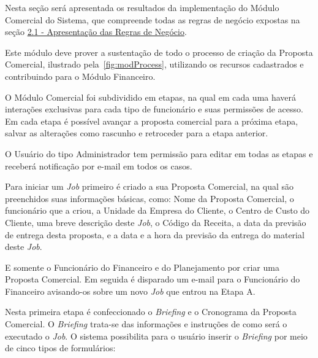 \documentclass[
  12pt,            %
  openany,
  oneside,
  a4paper,         %
  english,      %
  brazil
]{article}
\numberwithin{figure}{section}
\numberwithin{table}{section}
\newcounter{subsubsubsection}[subsubsection]
\begin{document}
Nesta seção será apresentada os resultados da implementação do Módulo Comercial do Sistema, que compreende todas as regras de negócio expostas na seção \hyperref[sec:2.1]{2.1 - Apresentação das Regras de Negócio}.

Este módulo deve prover a sustentação de todo o processo de criação da Proposta Comercial, ilustrado pela~\autoref{fig:modProcess}, utilizando os recursos cadastrados e contribuindo para o Módulo Financeiro.

O Módulo Comercial foi subdividido em etapas, na qual em cada uma haverá interações exclusivas para cada tipo de funcionário e suas permissões de acesso. Em cada etapa é possível avançar a proposta comercial para a próxima etapa, salvar as alterações como rascunho e retroceder para a etapa anterior.

O Usuário do tipo Administrador tem permissão para editar em todas as etapas e receberá notificação por e-mail em todos os casos.



Para iniciar um \textit{Job} primeiro é criado a sua Proposta Comercial, na qual são preenchidos suas informações básicas, como: Nome da Proposta Comercial, o funcionário que a criou, a Unidade da Empresa do Cliente, o Centro de Custo do Cliente, uma breve descrição deste \textit{Job}, o Código da Receita, a data da previsão de entrega desta proposta, e a data e a hora da previsão da entrega do material deste \textit{Job}.

E somente o Funcionário do Financeiro e do Planejamento por criar uma Proposta Comercial. Em seguida é disparado um e-mail para o Funcionário do Financeiro avisando-os sobre um novo \textit{Job} que entrou na Etapa A.



Nesta primeira etapa é confeccionado o \textit{Briefing} e o Cronograma da Proposta Comercial. O \textit{Briefing} trata-se das informações e instruções de como será o executado o \textit{Job}. O sistema possibilita para o usuário inserir o \textit{Briefing} por meio de cinco tipos de formulários:
\end{document}
